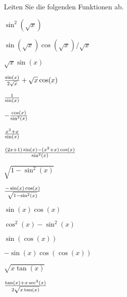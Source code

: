 \begin{exercises}
Leiten Sie die folgenden Funktionen ab.

\twocol

\begin{exercise} $\sin^2(\sqrt{x})$
\begin{answer} $\sin(\sqrt{x})\cos(\sqrt{x})/\sqrt{x}$
\end{answer}\end{exercise}

\begin{exercise} $\sqrt{x}\sin(x)$
\begin{answer} ${\sin(x)\over2\sqrt x}+\sqrt{x}\cos(x)$
\end{answer}\end{exercise}

\begin{exercise} ${1\over \sin(x)}$
\begin{answer} $ -{\cos(x)\over \sin^2(x)}$
\end{answer}\end{exercise}

\begin{exercise} ${x^2+x\over \sin(x)}$
\begin{answer} ${(2x +1)\sin(x) - (x^2+x)\cos(x) \over \sin^2 (x)}$
\end{answer}\end{exercise}

\begin{exercise} $\sqrt{1-\sin^2(x)}$
\begin{answer} ${-\sin(x)\cos(x)\over \sqrt{1-\sin^2(x)}}$
\end{answer}\end{exercise}

\begin{exercise} $\sin (x)\cos(x)$
\begin{answer} $\cos^2(x)-\sin^2(x)$
\end{answer}\end{exercise}

\begin{exercise} $\sin(\cos(x))$
\begin{answer} $-\sin(x)\cos(\cos(x))$
\end{answer}\end{exercise}

\begin{exercise} $\sqrt{x\tan(x)}$
\begin{answer} ${\tan(x)+x\sec^2(x)\over2\sqrt{x\tan(x)}}$
\end{answer}\end{exercise}


\end{exercises}
